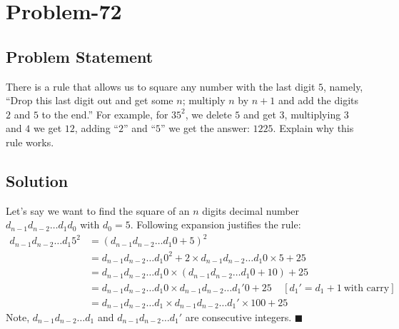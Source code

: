 \documentclass[12pt]{article}
\begin{document}
\section*{Problem-72}
\subsection*{Problem Statement}
There is a rule that allows us to square any number with the last digit $5$, namely, ``Drop this last digit out and get some $n$; multiply $n$ by $n+1$ and add the digits $2$ and $5$ to the end.'' For example, for $35^2$, we delete $5$ and get $3$, multiplying $3$ and $4$ we get $12$, adding ``$2$'' and ``$5$'' we get the answer: $1225$. Explain why this rule works.
\subsection*{Solution}
Let's say we want to find the square of an $n$ digits decimal number $d_{n-1}d_{n-2}\ldots d_{1}d_{0}$ with $d_{0}=5$. Following expansion justifies the rule:
\begin{displaymath}
\begin{split}
	{d_{n-1}d_{n-2}\ldots d_{1}5}^2 &= \left( d_{n-1}d_{n-2}\ldots d_{1}0 + 5 \right)^2\\
	                                &= {d_{n-1}d_{n-2}\ldots d_{1}0}^2 + 2\times d_{n-1}d_{n-2}\ldots d_{1}0 \times 5 + 25\\
	                                &= d_{n-1}d_{n-2}\ldots d_{1}0 \times \left(d_{n-1}d_{n-2}\ldots d_{1}0+10\right)+25\\
	                                &= d_{n-1}d_{n-2}\ldots d_{1}0 \times d_{n-1}d_{n-2}\ldots d_{1}'0+25\ \ \ \ \ [d_{1}' = d_{1}+1\ \textrm{with carry}]\\
	                                &= d_{n-1}d_{n-2}\ldots d_{1} \times d_{n-1}d_{n-2}\ldots d_{1}' \times 100 + 25
\end{split}
\end{displaymath}
Note, $d_{n-1}d_{n-2}\ldots d_{1}$ and $d_{n-1}d_{n-2}\ldots d_{1}'$ are consecutive integers.  $\blacksquare$
\end{document}
